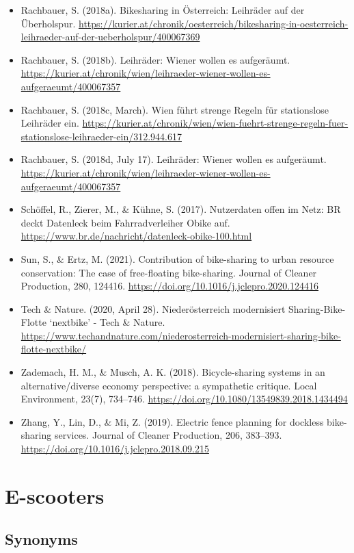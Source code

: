 \documentclass[
]{book}
\begin{document}
\begin{itemize}
\item
  Rachbauer, S. (2018a). Bikesharing in Österreich: Leihräder auf der Überholspur. \url{https://kurier.at/chronik/oesterreich/bikesharing-in-oesterreich-leihraeder-auf-der-ueberholspur/400067369}
\item
  Rachbauer, S. (2018b). Leihräder: Wiener wollen es aufgeräumt. \url{https://kurier.at/chronik/wien/leihraeder-wiener-wollen-es-aufgeraeumt/400067357}
\item
  Rachbauer, S. (2018c, March). Wien führt strenge Regeln für stationslose Leihräder ein. \url{https://kurier.at/chronik/wien/wien-fuehrt-strenge-regeln-fuer-stationslose-leihraeder-ein/312.944.617}
\item
  Rachbauer, S. (2018d, July 17). Leihräder: Wiener wollen es aufgeräumt. \url{https://kurier.at/chronik/wien/leihraeder-wiener-wollen-es-aufgeraeumt/400067357}
\item
  Schöffel, R., Zierer, M., \& Kühne, S. (2017). Nutzerdaten offen im Netz: BR deckt Datenleck beim Fahrradverleiher Obike auf. \url{https://www.br.de/nachricht/datenleck-obike-100.html}
\item
  Sun, S., \& Ertz, M. (2021). Contribution of bike-sharing to urban resource conservation: The case of free-floating bike-sharing. Journal of Cleaner Production, 280, 124416. \url{https://doi.org/10.1016/j.jclepro.2020.124416}
\item
  Tech \& Nature. (2020, April 28). Niederösterreich modernisiert Sharing-Bike-Flotte `nextbike' - Tech \& Nature. \url{https://www.techandnature.com/niederosterreich-modernisiert-sharing-bike-flotte-nextbike/}
\item
  Zademach, H. M., \& Musch, A. K. (2018). Bicycle-sharing systems in an alternative/diverse economy perspective: a sympathetic critique. Local Environment, 23(7), 734--746. \url{https://doi.org/10.1080/13549839.2018.1434494}
\item
  Zhang, Y., Lin, D., \& Mi, Z. (2019). Electric fence planning for dockless bike-sharing services. Journal of Cleaner Production, 206, 383--393. \url{https://doi.org/10.1016/j.jclepro.2018.09.215}
\end{itemize}

\hypertarget{scooters}{%
\section{E-scooters}\label{scooters}}

\hypertarget{synonyms-29}{%
\subsection*{Synonyms}\label{synonyms-29}}
\end{document}
